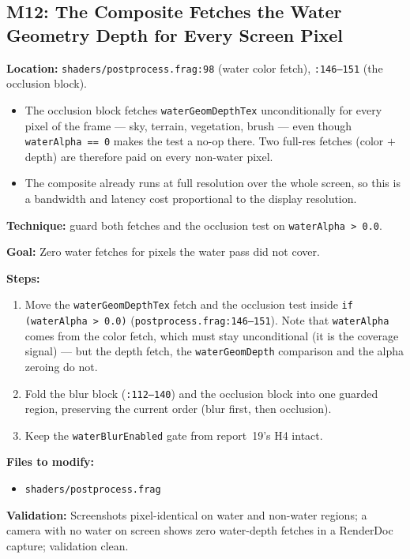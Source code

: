 \documentclass[11pt,a4paper]{article}
\begin{document}
\subsection{M12: The Composite Fetches the Water Geometry Depth for Every Screen Pixel}

\textbf{Location:} \texttt{shaders/postprocess.frag:98} (water color fetch), \texttt{:146--151} (the occlusion block).

\begin{itemize}
    \item The occlusion block fetches \texttt{waterGeomDepthTex} unconditionally for every pixel of the frame --- sky,
    terrain, vegetation, brush --- even though \texttt{waterAlpha == 0} makes the test a no-op there. Two full-res
    fetches (color $+$ depth) are therefore paid on every non-water pixel.
    \item The composite already runs at full resolution over the whole screen, so this is a bandwidth and latency cost
    proportional to the display resolution.
\end{itemize}

\textbf{Technique:} guard both fetches and the occlusion test on \texttt{waterAlpha > 0.0}.

\begin{tcolorbox}[promptbox={Prompt: Skip the Water Composite Work Where There Is No Water}]
\textbf{Goal:} Zero water fetches for pixels the water pass did not cover.

\textbf{Steps:}
\begin{enumerate}
    \item Move the \texttt{waterGeomDepthTex} fetch and the occlusion test inside \texttt{if (waterAlpha > 0.0)}
    (\texttt{postprocess.frag:146--151}). Note that \texttt{waterAlpha} comes from the color fetch, which must stay
    unconditional (it is the coverage signal) --- but the depth fetch, the \texttt{waterGeomDepth} comparison and the
    alpha zeroing do not.
    \item Fold the blur block (\texttt{:112--140}) and the occlusion block into one guarded region, preserving the
    current order (blur first, then occlusion).
    \item Keep the \texttt{waterBlurEnabled} gate from report~19's H4 intact.
\end{enumerate}

\textbf{Files to modify:}
\begin{itemize}
    \item \texttt{shaders/postprocess.frag}
\end{itemize}

\textbf{Validation:} Screenshots pixel-identical on water and non-water regions; a camera with no water on screen shows
zero water-depth fetches in a RenderDoc capture; validation clean.
\end{tcolorbox}
\end{document}
